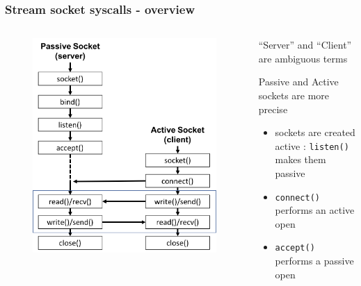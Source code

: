 \documentclass[newPxFont,sthlmFooter,nooffset]{beamer}
\begin{document}
\begin{frame}[t, fragile]
  \frametitle{Stream socket syscalls - overview}
\begin{columns}
\begin{column}{0.5\textwidth}
  \begin{figure}[h]
    \centering
    \includegraphics[width=\linewidth]{figures/fig_socket_syscall.png}
  \end{figure}
\end{column}
\begin{column}{0.5\textwidth}
 ``Server'' and ``Client'' are ambiguous terms

Passive and Active sockets are more precise
\begin{itemize}
\item sockets are created active : \texttt{listen()} makes them passive
\item \texttt{connect()} performs an active open
\item \texttt{accept()} performs a passive open
\end{itemize}
\end{column}
\end{columns}


\end{frame}
\end{document}
